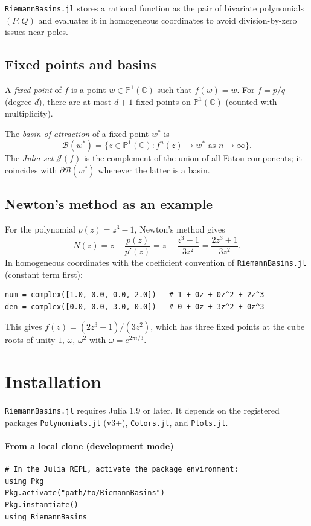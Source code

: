 \documentclass[11pt,a4paper]{article}
\theoremstyle{definition}
\newcommand{\C}{\mathbb{C}}
\newcommand{\Pone}{\mathbb{P}^1(\C)}
\newcommand{\pkg}[1]{\texttt{#1}}
\begin{document}
\pkg{RiemannBasins.jl} stores a rational function as the pair of bivariate
polynomials $(P,Q)$ and evaluates it in homogeneous coordinates to avoid
division-by-zero issues near poles.

\subsection{Fixed points and basins}

A \emph{fixed point} of $f$ is a point $w\in\Pone$ such that $f(w)=w$.
For $f = p/q$ (degree $d$), there are at most $d+1$ fixed points on $\Pone$
(counted with multiplicity).

The \emph{basin of attraction} of a fixed point $w^*$ is
\[
  \mathcal{B}(w^*) = \bigl\{z\in\Pone : f^n(z)\to w^*\text{ as }n\to\infty\bigr\}.
\]
The \emph{Julia set} $\mathcal{J}(f)$ is the complement of the union of all
Fatou components; it coincides with $\partial\mathcal{B}(w^*)$ whenever the
latter is a basin.

\subsection{Newton's method as an example}

For the polynomial $p(z) = z^3 - 1$, Newton's method gives
\[
  N(z) = z - \frac{p(z)}{p'(z)} = z - \frac{z^3-1}{3z^2} = \frac{2z^3+1}{3z^2}.
\]
In homogeneous coordinates with the coefficient convention of
\pkg{RiemannBasins.jl} (constant term first):
\begin{lstlisting}
num = complex([1.0, 0.0, 0.0, 2.0])   # 1 + 0z + 0z^2 + 2z^3
den = complex([0.0, 0.0, 3.0, 0.0])   # 0 + 0z + 3z^2 + 0z^3
\end{lstlisting}
This gives $f(z) = (2z^3+1)/(3z^2)$, which has three fixed points at the
cube roots of unity $1,\,\omega,\,\omega^2$ with $\omega = e^{2\pi i/3}$.

\section{Installation}

\pkg{RiemannBasins.jl} requires Julia 1.9 or later.
It depends on the registered packages
\pkg{Polynomials.jl} (v3+), \pkg{Colors.jl}, and \pkg{Plots.jl}.

\paragraph{From a local clone (development mode)}
\begin{lstlisting}
# In the Julia REPL, activate the package environment:
using Pkg
Pkg.activate("path/to/RiemannBasins")
Pkg.instantiate()
using RiemannBasins
\end{lstlisting}
\end{document}
